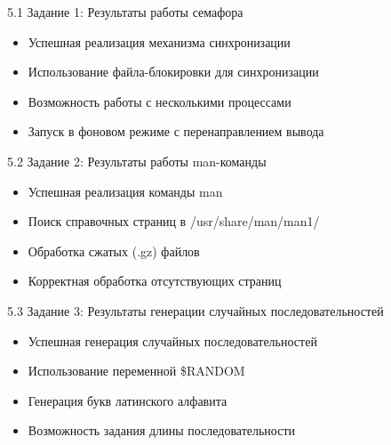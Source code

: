 \documentclass[
  ignorenonframetext,
  aspectratio=169,
  russian,
]{beamer}
\providecommand{\tightlist}{%
  \setlength{\itemsep}{0pt}\setlength{\parskip}{0pt}}
\begin{document}
\begin{frame}{5.1 Задание 1: Результаты работы семафора}
\label{ux437ux430ux434ux430ux43dux438ux435-1-ux440ux435ux437ux443ux43bux44cux442ux430ux442ux44b-ux440ux430ux431ux43eux442ux44b-ux441ux435ux43cux430ux444ux43eux440ux430}
\begin{itemize}[<+->]
\tightlist
\item
  Успешная реализация механизма синхронизации
\item
  Использование файла-блокировки для синхронизации
\item
  Возможность работы с несколькими процессами
\item
  Запуск в фоновом режиме с перенаправлением вывода
\end{itemize}
\end{frame}

\begin{frame}{5.2 Задание 2: Результаты работы man-команды}
\label{ux437ux430ux434ux430ux43dux438ux435-2-ux440ux435ux437ux443ux43bux44cux442ux430ux442ux44b-ux440ux430ux431ux43eux442ux44b-man-ux43aux43eux43cux430ux43dux434ux44b}
\begin{itemize}[<+->]
\tightlist
\item
  Успешная реализация команды man
\item
  Поиск справочных страниц в /usr/share/man/man1/
\item
  Обработка сжатых (.gz) файлов
\item
  Корректная обработка отсутствующих страниц
\end{itemize}
\end{frame}

\begin{frame}{5.3 Задание 3: Результаты генерации случайных
последовательностей}
\label{ux437ux430ux434ux430ux43dux438ux435-3-ux440ux435ux437ux443ux43bux44cux442ux430ux442ux44b-ux433ux435ux43dux435ux440ux430ux446ux438ux438-ux441ux43bux443ux447ux430ux439ux43dux44bux445-ux43fux43eux441ux43bux435ux434ux43eux432ux430ux442ux435ux43bux44cux43dux43eux441ux442ux435ux439}
\begin{itemize}[<+->]
\tightlist
\item
  Успешная генерация случайных последовательностей
\item
  Использование переменной \$RANDOM
\item
  Генерация букв латинского алфавита
\item
  Возможность задания длины последовательности
\end{itemize}
\end{frame}
\end{document}
